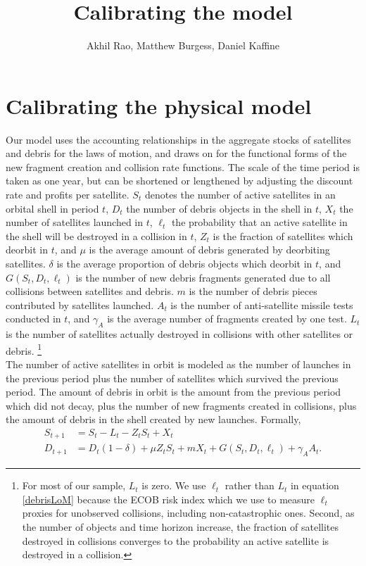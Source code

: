 \documentclass[12pt]{article}
\title{Calibrating the model}
\author{Akhil Rao, Matthew Burgess, Daniel Kaffine}
\begin{document}
	
	\maketitle

\section{Calibrating the physical model}	

Our model uses the accounting relationships in the aggregate stocks of satellites and debris for the laws of motion, and draws on \cite{bradleywein2009} for the functional forms of the new fragment creation and collision rate functions. The scale of the time period is taken as one year, but can be shortened or lengthened by adjusting the discount rate and profits per satellite. $S_t$ denotes the number of active satellites in an orbital shell in period $t$, $D_t$ the number of debris objects in the shell in $t$, $X_t$ the number of satellites launched in $t$, $\ell_t$ the probability that an active satellite in the shell will be destroyed in a collision in $t$, $Z_t$ is the fraction of satellites which deorbit in $t$, and $\mu$ is the average amount of debris generated by deorbiting satellites. $\delta$ is the average proportion of debris objects which deorbit in $t$, and $G(S_t,D_t,\ell_t)$ is the number of new debris fragments generated due to all collisions between satellites and debris. $m$ is the number of debris pieces contributed by satellites launched. $A_t$ is the number of anti-satellite missile tests conducted in $t$, and $\gamma_A$ is the average number of fragments created by one test. $L_t$ is the number of satellites actually destroyed in collisions with other satellites or debris. \footnote{For most of our sample, $L_t$ is zero. We use $\ell_t$ rather than $L_t$ in equation \ref{debrisLoM} because the ECOB risk index which we use to measure $\ell_t$ proxies for unobserved collisions, including non-catastrophic ones. Second, as the number of objects and time horizon increase, the fraction of satellites destroyed in collisions converges to the probability an active satellite is destroyed in a collision.}\\

The number of active satellites in orbit is modeled as the number of launches in the previous period plus the number of satellites which survived the previous period. The amount of debris in orbit is the amount from the previous period which did not decay, plus the number of new fragments created in collisions, plus the amount of debris in the shell created by new launches. Formally,
\begin{align}
\label{satelliteLoM}
S_{t+1} &= S_t -L_t -Z_tS_t + X_t \\
\label{debrisLoM}
D_{t+1} &= D_t(1-\delta) + \mu Z_tS_t + mX_t + G(S_t,D_t,\ell_t) + \gamma_A A_t.
\end{align}
\end{document}

